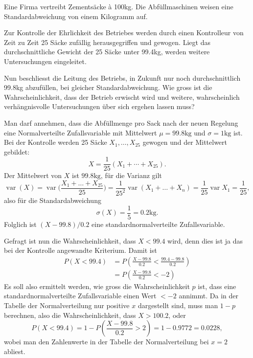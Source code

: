 Eine Firma vertreibt Zementsäcke \`a 100kg. Die Abfüllmaschinen weisen
eine Standardabweichung von einem Kilogramm auf.

Zur Kontrolle der Ehrlichkeit des Betriebes werden durch einen Kontrolleur
von Zeit zu Zeit 25 Säcke zufällig herausgegriffen und gewogen. Liegt
das durchschnittliche Gewicht der 25 Säcke unter 99.4kg, werden weitere
Untersuchungen eingeleitet.

Nun beschliesst die Leitung des Betriebs, in Zukunft nur noch durchschnittlich
99.8kg abzufüllen, bei gleicher Standardabweichung. Wie gross ist die
Wahrscheinlichkeit, dass der Betrieb erwischt wird und weitere, wahrscheinlich
verhängnisvolle Untersuchungen über sich ergehen lassen muss?


\begin{loesung}
Man darf annehmen, dass die Abfüllmenge pro Sack nach der neuen Regelung
eine Normalverteilte Zufallsvariable mit Mittelwert $\mu=99.8\text{kg}$ und
$\sigma=1\text{kg}$ ist. Bei der Kontrolle werden 25 Säcke $X_1,\dots,X_{25}$
gewogen und der Mittelwert gebildet:
\[
X=\frac1{25}(X_1+\cdots +X_{25}).
\]
Der Mittelwert von $X$ ist $99.8\text{kg}$, für die Varianz gilt
\[
\operatorname{var}(X)
=
\operatorname{var}\biggl(
\frac{X_1+\dots+X_{25}}{25}
\biggr)
=
\frac1{25^2}\operatorname{var}(X_1+\dots+X_n)
=
\frac1{25}\operatorname{var}{X_1}
=
\frac1{25},
\]
also für die Standardabweichung
\[
\sigma(X)=\frac15=0.2\text{kg}.
\]
Folglich ist $(X-99.8)/0.2$ eine standardnormalverteilte Zufallsvariable.

Gefragt ist nun die Wahrscheinlichkeit, dass $X<99.4$ wird, denn dies ist ja
das bei der Kontrolle angewandte Kriterium. Damit ist
\begin{align*}
P(X<99.4)
&=P\left(\frac{X-99.8}{0.2} < \frac{99.4-99.8}{0.2}\right)\\
&=P\left(\frac{X-99.8}{0.2} < -2\right)
\end{align*}
Es soll also ermittelt werden, wie gross die Wahrscheinlichkeit $p$ ist, dass
eine standardnormalverteilte Zufallsvariable einen Wert $<-2$ annimmt.
Da in der Tabelle der Normalverteilung nur positive $x$ dargestellt sind,
muss man $1-p$ berechnen, also die Wahrscheinlichkeit, dass $X>100.2$,
oder
\[
P(X<99.4)=1-P\left(\frac{X-99.8}{0.2}>2\right)
=1-0.9772=0.0228,
\]
wobei man den Zahlenwerte in der Tabelle der Normalverteilung bei $x=2$ abliest.
\end{loesung}

